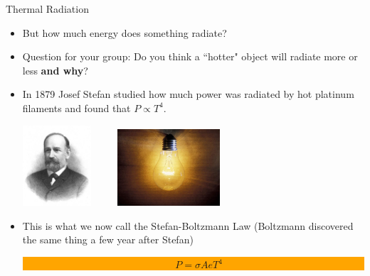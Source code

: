 \documentclass{beamer}
\begin{document}
\begin{frame}{Thermal Radiation}
\begin{itemize}
   \item But how much energy does something radiate?
   \item Question for your group: Do you think a ``hotter" object will radiate more or less {\bf and why}?
   \item<2-> In 1879 Josef Stefan studied how much power was radiated by hot platinum filaments and found that $P \propto T^4$.
\begin{center}
   \includegraphics[width=0.20\textwidth]{figures/stefan.jpg}
   ~~~~
   \includegraphics[width=0.30\textwidth]{figures/light_bulb.jpg}
\end{center}
\item<2-> This is what we now call the Stefan-Boltzmann Law (Boltzmann discovered the same thing a few year after Stefan)
\begin{center}
\colorbox{orange}{\parbox{0.3\textwidth}{
   \begin{eqnarray*}
      ~~~~~ P = \sigma A e T^4
   \end{eqnarray*}
}}
\end{center}
\end{itemize}
\end{frame}
\end{document}
